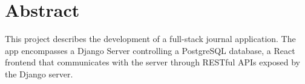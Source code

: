 \chapter{Abstract}
This project describes the development of a full-stack journal application. The app encompasses a Django Server controlling a PostgreSQL database, a React frontend that communicates with the server through RESTful APIs exposed by the Django server. 